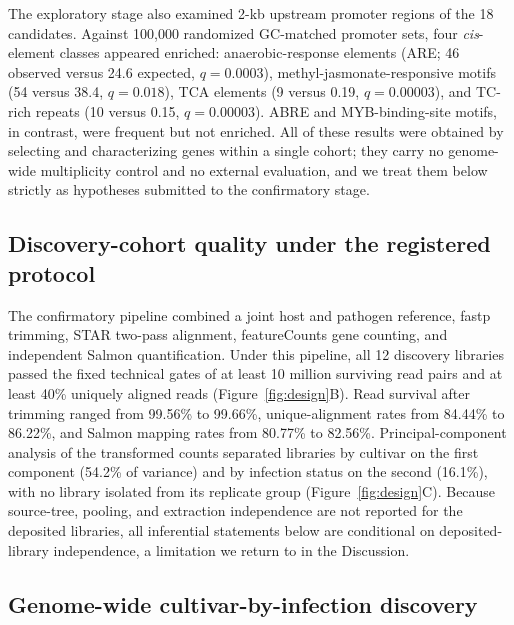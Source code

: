 \documentclass[referee,pdflatex,sn-basic,Numbered]{sn-jnl}
\newcommand{\q}{\textit{q}}
\begin{document}
The exploratory stage also examined 2-kb upstream promoter regions of the 18 candidates. Against 100,000 randomized GC-matched promoter sets, four \textit{cis}-element classes appeared enriched: anaerobic-response elements (ARE; 46 observed versus 24.6 expected, $\q=0.0003$), methyl-jasmonate-responsive motifs (54 versus 38.4, $\q=0.018$), TCA elements (9 versus 0.19, $\q=0.00003$), and TC-rich repeats (10 versus 0.15, $\q=0.00003$). ABRE and MYB-binding-site motifs, in contrast, were frequent but not enriched. All of these results were obtained by selecting and characterizing genes within a single cohort; they carry no genome-wide multiplicity control and no external evaluation, and we treat them below strictly as hypotheses submitted to the confirmatory stage.

\subsection{Discovery-cohort quality under the registered protocol}

The confirmatory pipeline combined a joint host and pathogen reference, fastp trimming, STAR two-pass alignment, featureCounts gene counting, and independent Salmon quantification. Under this pipeline, all 12 discovery libraries passed the fixed technical gates of at least 10 million surviving read pairs and at least 40\% uniquely aligned reads (Figure~\ref{fig:design}B). Read survival after trimming ranged from 99.56\% to 99.66\%, unique-alignment rates from 84.44\% to 86.22\%, and Salmon mapping rates from 80.77\% to 82.56\%. Principal-component analysis of the transformed counts separated libraries by cultivar on the first component (54.2\% of variance) and by infection status on the second (16.1\%), with no library isolated from its replicate group (Figure~\ref{fig:design}C). Because source-tree, pooling, and extraction independence are not reported for the deposited libraries, all inferential statements below are conditional on deposited-library independence, a limitation we return to in the Discussion.

\subsection{Genome-wide cultivar-by-infection discovery}
\end{document}
